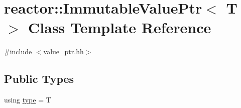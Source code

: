 \hypertarget{classreactor_1_1ImmutableValuePtr}{}\section{reactor\+:\+:Immutable\+Value\+Ptr$<$ T $>$ Class Template Reference}
\label{classreactor_1_1ImmutableValuePtr}


{\ttfamily \#include $<$value\+\_\+ptr.\+hh$>$}

\subsection*{Public Types}
\begin{DoxyCompactItemize}
\item 
using \hyperlink{classreactor_1_1ImmutableValuePtr_a88dbe82ff9b732b87e054ee37254bdfa}{type} = T
\end{DoxyCompactItemize}
